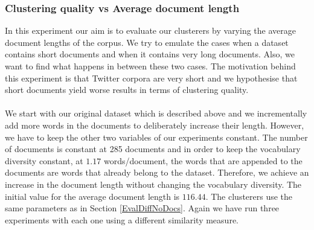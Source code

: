\subsubsection{Clustering quality vs Average document length}
In this experiment our aim is to evaluate our clusterers by varying the average document lengths of the corpus. We try to emulate the cases when a dataset contains short documents and when it contains very long documents. Also, we want to find what happens in between these two cases. The motivation behind this experiment is that Twitter corpora are very short and we hypothesise that short documents yield worse results in terms of clustering quality.\\\\
We start with our original dataset which is described above and we incrementally add more words in the documents to deliberately increase their length. However, we have to keep the other two variables of our experiments constant. The number of documents is constant at 285 documents and in order to keep the vocabulary diversity constant, at $1.17$ words/document, the words that are appended to the documents are words that already belong to the dataset. Therefore, we achieve an increase in the document length without changing the vocabulary diversity. The initial value for the average document length is $116.44$. The clusterers use the same parameters as in Section \ref{EvalDiffNoDocs}. Again we have run three experiments with each one using a different similarity measure.\\\\  
